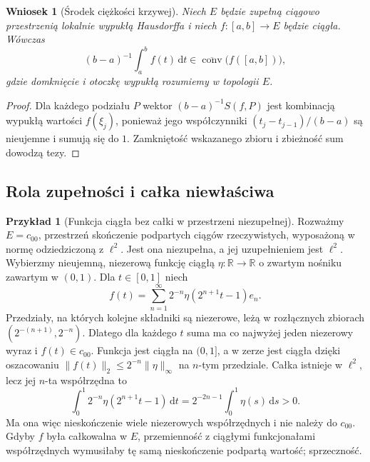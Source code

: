 \documentclass[11pt,a4paper]{article}
\numberwithin{equation}{section}
\theoremstyle{plain}
\newtheorem{wniosek}[twierdzenie]{Wniosek}
\theoremstyle{definition}
\newtheorem{przyklad}[twierdzenie]{Przykład}
\theoremstyle{remark}
\newcommand{\R}{\mathbb R}
\begin{document}
\begin{wniosek}[Środek ciężkości krzywej]
\label{cor:barycenter15a}
Niech $E$ będzie zupełną ciągowo przestrzenią lokalnie wypukłą
Hausdorffa i niech $f:[a,b]\to E$ będzie ciągła. Wówczas
\[
 (b-a)^{-1}\int_a^b f(t)\,\mathrm dt
 \in\overline{\operatorname{conv}}\bigl(f([a,b])\bigr),
\]
gdzie domknięcie i otoczkę wypukłą rozumiemy w topologii $E$.
\end{wniosek}
\begin{proof}
Dla każdego podziału $P$ wektor $(b-a)^{-1}S(f,P)$ jest
kombinacją wypukłą wartości $f(\xi_j)$, ponieważ jego
współczynniki $(t_j-t_{j-1})/(b-a)$ są nieujemne i sumują się do $1$.
Zamkniętość wskazanego zbioru i zbieżność sum dowodzą tezy.
\end{proof}

\subsection{Rola zupełności i całka niewłaściwa}

\begin{przyklad}[Funkcja ciągła bez całki w przestrzeni niezupełnej]
\label{ex:noncomplete-integral15a}
Rozważmy $E=c_{00}$, przestrzeń skończenie podpartych ciągów
rzeczywistych, wyposażoną w normę odziedziczoną z $\ell^2$.
Jest ona niezupełna, a jej uzupełnieniem jest $\ell^2$.
Wybierzmy nieujemną, niezerową funkcję ciągłą $\eta:\R\to\R$
o zwartym nośniku zawartym w $(0,1)$.
Dla $t\in[0,1]$ niech
\[
 f(t)=\sum_{n=1}^{\infty}2^{-n}\eta(2^{n+1}t-1)e_n.
\]
Przedziały, na których kolejne składniki są niezerowe,
leżą w rozłącznych zbiorach $(2^{-(n+1)},2^{-n})$.
Dlatego dla każdego $t$ suma ma co najwyżej jeden niezerowy
wyraz i $f(t)\in c_{00}$. Funkcja jest ciągła na $(0,1]$,
a w zerze jest ciągła dzięki oszacowaniu
$\|f(t)\|_2\le2^{-n}\|\eta\|_\infty$ na $n$-tym przedziale.
Całka istnieje w $\ell^2$, lecz jej $n$-ta współrzędna to
\[
 \int_0^1 2^{-n}\eta(2^{n+1}t-1)\,\mathrm dt
 =2^{-2n-1}\int_0^1\eta(s)\,\mathrm ds>0.
\]
Ma ona więc nieskończenie wiele niezerowych współrzędnych i nie
należy do $c_{00}$. Gdyby $f$ była całkowalna w $E$, przemienność
z ciągłymi funkcjonałami współrzędnych wymusiłaby tę samą
nieskończenie podpartą wartość; sprzeczność.
\end{przyklad}
\end{document}
